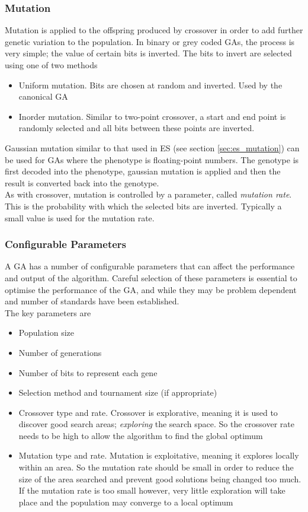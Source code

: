 \subsubsection{Mutation}
Mutation is applied to the offspring produced by crossover in order to add further genetic variation to the population. In binary or grey coded GAs, the process is very simple; the value of certain bits is inverted. The bits to invert are selected using one of two methods
\begin{itemize}
  \item{Uniform mutation. Bits are chosen at random and inverted. Used by the canonical GA}
  \item{Inorder mutation. Similar to two-point crossover, a start and end point is randomly selected and all bits between these points are inverted.}
\end{itemize}
Gaussian mutation similar to that used in ES (see section \ref{sec:es_mutation}) can be used for GAs where the phenotype is floating-point numbers. The genotype is first decoded into the phenotype, gaussian mutation is applied and then the result is converted back into the genotype.\cite{4-ga}
\\As with crossover, mutation is controlled by a parameter, called \emph{mutation rate}. This is the probability with which the selected bits are inverted. Typically a small value is used for the mutation rate\cite{4-ga, garates}.

\subsubsection{Configurable Parameters}
A GA has a number of configurable parameters that can affect the performance and output of the algorithm. Careful selection of these parameters is essential to optimise the performance of the GA, and while they may be problem dependent and number of standards have been established\cite{gap, iga}.
\\The key parameters are
\begin{itemize}
  \item{Population size}
  \item{Number of generations}
  \item{Number of bits to represent each gene}
  \item{Selection method and tournament size (if appropriate)}
  \item{Crossover type and rate. Crossover is explorative, meaning it is used to discover good search areas; \emph{exploring} the search space. So the crossover rate needs to be high to allow the algorithm to find the global optimum}
  \item{Mutation type and rate. Mutation is exploitative, meaning it explores locally within an area. So the mutation rate should be small in order to reduce the size of the area searched and prevent good solutions being changed too much. If the mutation rate is too small however, very little exploration will take place and the population may converge to a local optimum}
\end{itemize}

